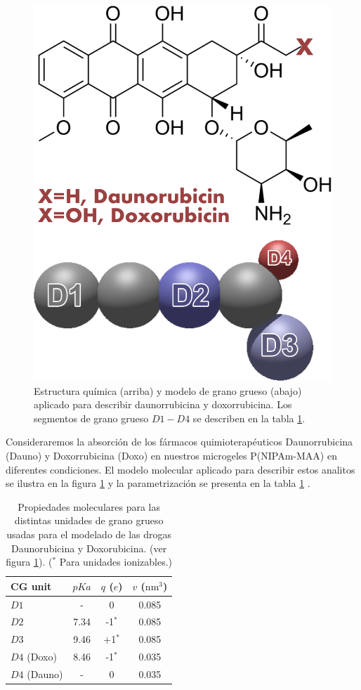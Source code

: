 \begin{figure}[!tb]
\centering
\includegraphics[width=0.35\linewidth]{Figures/graph-gel/dauno-doxo.png}
\caption{Estructura qu\'imica (arriba) y modelo de grano grueso (abajo) aplicado para describir daunorrubicina y doxorrubicina.
	Los segmentos de grano grueso $D1-D4$ se describen en la tabla \ref{table:gel:drugs}.}
\label{fig:gel:dauno-doxo}
\end{figure}


Consideraremos la absorci\'on de los f\'armacos quimioterap\'euticos Daunorrubicina (Dauno) y Doxorrubicina (Doxo) en nuestros microgeles P(NIPAm-MAA) en diferentes condiciones.
El modelo molecular aplicado para describir estos analitos se ilustra en la figura \ref{fig:gel:dauno-doxo} y la parametrizaci\'on se presenta en la tabla \ref{table:gel:drugs} \cite{PerezChavez2020}.

\begin{table}
\centering
\begin{tabular}{|lccc|}
    \hline
    {CG unit} & {$pKa$} & {$q$ ($e$)} & {$v$ ($\text{nm}^3$)} \\
      \hline
$D1$ & - & 0 & 0.085\\
$D2$ & 7.34 & -1$^\ast$ & 0.085\\
$D3$ & 9.46 & +1$^\ast$ & 0.085\\ 
$D4$ (Doxo) & 8.46 & -1$^\ast$ & 0.035\\
$D4$ (Dauno) & - & 0 & 0.035 \\
    \hline
  \end{tabular}
 \caption{Propiedades moleculares para las distintas unidades de grano grueso usadas para el modelado de las drogas Daunorubicina y Doxorubicina. (ver figura \ref{fig:gel:dauno-doxo}).
\footnotesize ($^\ast$ Para unidades ionizables.)}
\label{table:gel:drugs} 
\end{table}




